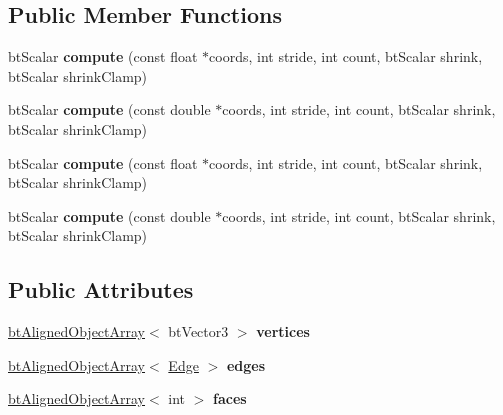 \subsection*{Public Member Functions}
\begin{DoxyCompactItemize}
\item 
\mbox{\label{classbtConvexHullComputer_aee4950eb396c47742806720b0795ef54}} 
bt\+Scalar {\bfseries compute} (const float $\ast$coords, int stride, int count, bt\+Scalar shrink, bt\+Scalar shrink\+Clamp)
\item 
\mbox{\label{classbtConvexHullComputer_aa1a88c8d625dbd098e2eba2398fffe90}} 
bt\+Scalar {\bfseries compute} (const double $\ast$coords, int stride, int count, bt\+Scalar shrink, bt\+Scalar shrink\+Clamp)
\item 
\mbox{\label{classbtConvexHullComputer_aee4950eb396c47742806720b0795ef54}} 
bt\+Scalar {\bfseries compute} (const float $\ast$coords, int stride, int count, bt\+Scalar shrink, bt\+Scalar shrink\+Clamp)
\item 
\mbox{\label{classbtConvexHullComputer_aa1a88c8d625dbd098e2eba2398fffe90}} 
bt\+Scalar {\bfseries compute} (const double $\ast$coords, int stride, int count, bt\+Scalar shrink, bt\+Scalar shrink\+Clamp)
\end{DoxyCompactItemize}
\subsection*{Public Attributes}
\begin{DoxyCompactItemize}
\item 
\mbox{\label{classbtConvexHullComputer_a8f70348dd5e847323677251428f0e675}} 
\hyperlink{classbtAlignedObjectArray}{bt\+Aligned\+Object\+Array}$<$ bt\+Vector3 $>$ {\bfseries vertices}
\item 
\mbox{\label{classbtConvexHullComputer_ab6887bab904ddb8449721f53aacf6289}} 
\hyperlink{classbtAlignedObjectArray}{bt\+Aligned\+Object\+Array}$<$ \hyperlink{classbtConvexHullComputer_1_1Edge}{Edge} $>$ {\bfseries edges}
\item 
\mbox{\label{classbtConvexHullComputer_a599caddd26688cf4a526a6536f6dfd93}} 
\hyperlink{classbtAlignedObjectArray}{bt\+Aligned\+Object\+Array}$<$ int $>$ {\bfseries faces}
\end{DoxyCompactItemize}


